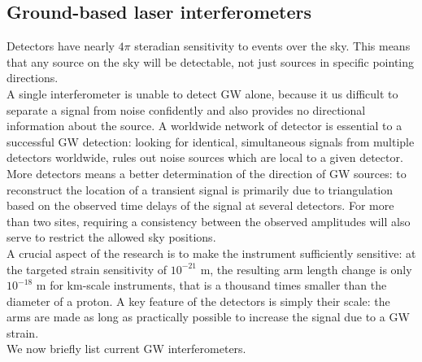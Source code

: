 \documentclass[binding=0.6cm, LaM]{sapthesis}
\begin{document}
\subsection{Ground-based laser interferometers}

	Detectors have nearly $4\pi$ steradian sensitivity to events over the sky. 
	This means that any source on the sky will be detectable,
        not just sources in specific pointing directions. \\
	A single interferometer is unable to detect GW alone,
	because it us difficult to separate a signal from noise confidently 
	and also provides no directional information about the source.
	A worldwide network of detector is essential to a successful GW detection:
	looking for identical, simultaneous signals from multiple detectors worldwide, 
	rules out noise sources which are local to a given detector. 
	More detectors means a better determination of the direction of GW sources: 
	to reconstruct the location of a transient signal is primarily due to triangulation 
	based on the observed time delays of the signal at several detectors. 
	For more than two sites, requiring a consistency between the observed amplitudes 
	will also serve to restrict the allowed sky positions\cite{12}. \\
	A crucial aspect of the research is to make the instrument sufficiently sensitive:
        at the targeted strain sensitivity of $10^{−21}$ m, the resulting arm length change is only $ 10^{-18}$ m for km-scale instruments, that is
        a thousand times smaller than the diameter of a proton.
        A key feature of the detectors is simply their scale:
        the arms are made as long as practically possible to increase the signal due to a GW strain. \\
	We now briefly list current GW interferometers.
\end{document}
